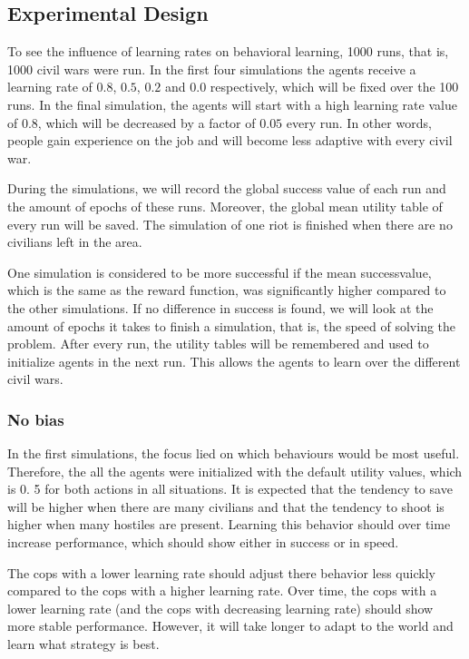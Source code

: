 \subsection{Experimental Design}
To see the influence of learning rates on behavioral learning, 1000 runs, that is, 1000 civil wars were run.
In the first four simulations the agents receive a learning rate of $0.
8$, $0.
5$, $0.
2$ and $0.
0$ respectively, which will be fixed over the 100 runs.
In the final simulation, the agents will start with a high learning rate value of $0.
8$, which will be decreased by a factor of $0.
05$ every run.
In other words, people gain experience on the job and will become less adaptive with every civil war.


During the simulations, we will record the global success value of each run and the amount of epochs of these runs.
Moreover, the global mean utility table of every run will be saved.
The simulation of one riot is finished when there are no civilians left in the area.


One simulation is considered to be more successful if the mean successvalue, which is the same as the reward function, was significantly higher compared to the other simulations.
If no difference in success is found, we will look at the amount of epochs it takes to finish a simulation, that is, the speed of solving the problem.
After every run, the utility tables will be remembered and used to initialize agents in the next run.
This allows the agents to learn over the different civil wars.


\subsubsection{No bias}
In the first simulations, the focus lied on which behaviours would be most useful.
Therefore, the all the agents were initialized with the default utility values, which is 0.
5 for both actions in all situations.
It is expected that the tendency to save will be higher when there are many civilians and that the tendency to shoot is higher when many hostiles are present.
Learning this behavior should over time increase performance, which should show either in success or in speed.


The cops with a lower learning rate should adjust there behavior less quickly compared to the cops with a higher learning rate.
Over time, the cops with a lower learning rate (and the cops with decreasing learning rate) should show more stable performance.
However, it will take longer to adapt to the world and learn what strategy is best.


